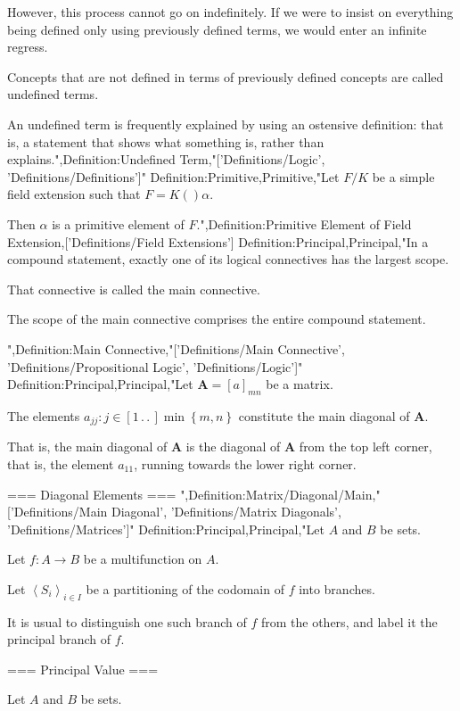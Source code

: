 However, this process cannot go on indefinitely. If we were to insist on everything being defined only using previously defined terms, we would enter an infinite regress.


Concepts that are not defined in terms of previously defined concepts are called undefined terms.

An undefined term is frequently explained by using an ostensive definition: that is, a statement that shows what something is, rather than explains.",Definition:Undefined Term,"['Definitions/Logic', 'Definitions/Definitions']"
Definition:Primitive,Primitive,"Let $F / K$ be a simple field extension such that $F = K \left(   \right)\alpha$.


Then $\alpha$ is a primitive element of $F$.",Definition:Primitive Element of Field Extension,['Definitions/Field Extensions']
Definition:Principal,Principal,"In a compound statement, exactly one of its logical connectives has the largest scope.

That connective is called the main connective.

The scope of the main connective comprises the entire compound statement.


",Definition:Main Connective,"['Definitions/Main Connective', 'Definitions/Propositional Logic', 'Definitions/Logic']"
Definition:Principal,Principal,"Let $\mathbf A = \left[ a \right]_{m n}$ be a matrix.

The elements $a_{j j}: j \in \left[ 1 \,.\,.\,   \right]{\min \left\lbrace m, n \right\rbrace }$ constitute the main diagonal of $\mathbf A$.

That is, the main diagonal of $\mathbf A$ is the diagonal of $\mathbf A$ from the top left corner, that is, the element $a_{1 1}$, running towards the lower right corner.


=== Diagonal Elements ===
",Definition:Matrix/Diagonal/Main,"['Definitions/Main Diagonal', 'Definitions/Matrix Diagonals', 'Definitions/Matrices']"
Definition:Principal,Principal,"Let $A$ and $B$ be sets.

Let $f: A \to B$ be a multifunction on $A$.

Let $\left\langle S_i \right\rangle_{i \mathop \in I}$ be a partitioning of the codomain of $f$ into branches.


It is usual to distinguish one such branch of $f$ from the others, and label it the principal branch of $f$.


=== Principal Value ===

Let $A$ and $B$ be sets.

